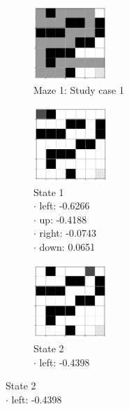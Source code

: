 \documentclass[a4paper]{article}    %
\begin{document}
\begin{figure}[H]
    \centering
    \begin{subfigure}{0.24\textwidth}
        \centering
        \includegraphics[width=2.8cm]{maze1-case1}
        \caption{Maze 1: Study case 1 \vspace{12mm}}
        \label{fig:maze1-case1-states}
    \end{subfigure}
    \hfill
    \centering
    \begin{subfigure}{0.24\textwidth}
        \centering
        \includegraphics[width=2.8cm]{maze1-case1-state1}
        \caption{State 1 \\
            \scriptsize
            \hspace*{5mm} $\boldsymbol{\cdot}$ left:  -0.6266 \\
            \hspace*{5mm} $\boldsymbol{\cdot}$ up:    -0.4188 \\
            \hspace*{5mm} $\boldsymbol{\cdot}$ right: -0.0743 \\
            \hspace*{5mm} $\boldsymbol{\cdot}$ down:   0.0651 }
        \label{fig:maze1-case1-state1}
    \end{subfigure}
    \hfill
    \begin{subfigure}{0.24\textwidth}
        \centering
        \includegraphics[width=2.8cm]{maze1-case1-state2}
        \caption{State 2 \\
            \scriptsize
            \hspace*{5mm} $\boldsymbol{\cdot}$ left:  -0.4398 \\
}
\end{subfigure}
\end{figure}
\end{document}
